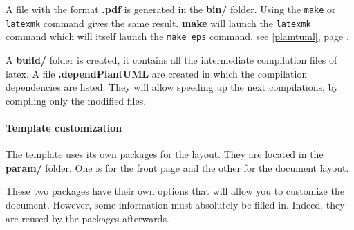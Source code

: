 A file with the format \textbf{.pdf} is generated in the \textbf{bin/} folder.
Using the \texttt{make} or \texttt{latexmk} command gives the same result.
\textbf{make} will launch the \texttt{latexmk} command which will itself launch the
\texttt{make eps} command, see \ref{plamtuml}, page \pageref{plamtuml}.\newline

A \textbf{build/} folder is created, it contains all the intermediate compilation files of
\gls{latex}. A file \textbf{.dependPlantUML} are created in which the compilation dependencies are
listed. They will allow speeding up the next compilations, by compiling only the modified files.

\paragraph{Template customization}
The template uses its own packages for the layout.
They are located in the \textbf{param/} folder.
One is for the front page and the other for the document layout.

These two packages have their own options that will allow you to customize the document.
However, some information must absolutely be filled in. Indeed, they are reused by the packages
afterwards.

